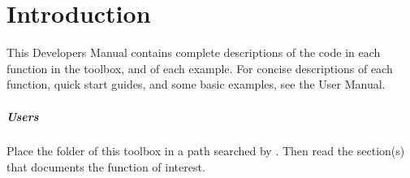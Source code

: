 \chapter{Introduction}

\begin{devMan}
This Developers Manual contains complete descriptions of the code in each function in the toolbox, and of each example.  For concise descriptions of each function, quick start guides, and some basic examples, see the User Manual.
\end{devMan}


\paragraph{Users}
Place the folder of this toolbox in a path searched by \script.
Then read the section(s) that documents the function of interest.


